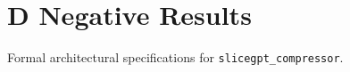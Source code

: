 \section{D Negative Results}

Formal architectural specifications for \texttt{slicegpt_compressor}.
